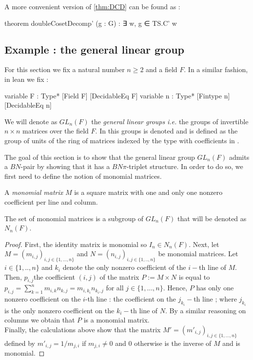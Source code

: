 A more convenient version of \ref{thm:DCD} can be found as :
\begin{leancode}
theorem doubleCosetDecomp' (g : G) : ∃ w, g ∈ TS.C' w 
\end{leancode}



\subsection{Example : the general linear group}
\label{sub:GL}
For this section we fix a natural number $n \ge 2$ and a field $F$.
In a similar fashion, in lean we fix : 
\begin{leancode}
variable {F : Type*} [Field F] [DecidableEq F] 
variable {n : Type*} [Fintype n] [DecidableEq n] 
\end{leancode}

\begin{notation}
    We will denote as $GL_n(F)$ the \emph{general linear groups} \textit{i.e.} the groups of invertible $n \times n$ matrices over the field $F$. In \Lean this groups is denoted  and is defined as the group of units of the ring  of matrices indexed by the type  with coefficients in .
\end{notation} 

The goal of this section is to show that the general linear group $GL_n\left( F \right)$ admits a $BN$-pair by showing that it has a $BN\pi$-triplet structure. In order to do so, we first need to define the notion of monomial matrices.

\begin{definition}
    A \emph{monomial matrix} $M$ is a square matrix with one and only one nonzero coefficient per line and column.
\end{definition}

\begin{propriete} \label{prop:monomial}
    The set of monomial matrices is a subgroup of $GL_n\left( F \right)$ that will be denoted as $N_n(F)$.
\end{propriete}

\begin{proof}
    First, the identity matrix is monomial so $I_n \in N_n(F)$. Next, let $M = \left( m_{i,j} \right)_{i,j \in \{1,\ldots,n\}}$ and $N =\left( n_{i,j} \right)_{i,j \in \{1,..,n\}}$ be monomial matrices. Let $i \in \{1,..,n\}$ and $k_i$ denote the only nonzero coefficient of the $i-$th line of $M$. Then, $p_{i,j}$the coefficient $(i,j)$ of the matrix $P:= M \times N$ is equal to $p_{i,j} = \sum_{k=1}^{n} m_{i,k}n_{k,j} = m_{i,k_i}n_{k_i, j}$ for all $j \in \{1,\ldots,n\}$. Hence, $P$ has only one nonzero coefficient on the $i$-th line : the coefficient on the $j_{k_i}-$th line ; where $j_{k_i}$ is the only nonzero coefficient on the $k_i-$th line of $N$. By a similar reasoning on columns we obtain that $P$ is a monomial matrix.\\
    Finally, the calculations above show that the matrix $M' = \left( m'_{i,j} \right)_{i,j \in \{1,\ldots,n\}}$ defined by $m'_{i,j} = 1 /{m_{j,i}}$ if $m_{j,i} \neq 0$ and $0$ otherwise is the inverse of $M$ and is monomial.
\end{proof}

